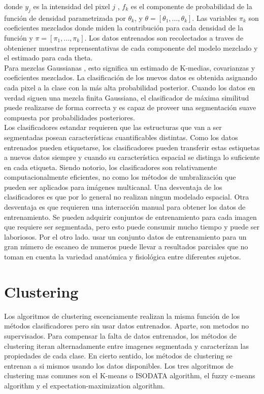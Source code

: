 \documentclass[12pt]{report}
\begin{document}
donde $y_{j}$ es la intensidad del pixel $j$ , $f_{k}$ es el componente de probabilidad de la función de densidad parametrizada por $\theta_{k}$, y $\theta = [\theta_{1},...,\theta_{k}]$. Las variables $\pi_{k}$ son coeficientes mezclados donde miden la contribución para cada densidad de la función y $\pi = [\pi_{1},...,\pi_{k}]$.
Los datos entrenados son recolectados a traves de obteniener muestras reprensentativas de cada componente del modelo mezclado y el estimado para cada theta.\\

Para mezclas Gaussianas , esto significa un estimado de K-medias, covarianzas y coeficientes mezclados.
La clasificación de los nuevos datos es obtenida asignando cada pixel a la clase con la más alta probabilidad posterior. Cuando los datos en verdad siguen una mezcla finita Gaussiana, el clasificador de  máxima similitud puede realizarse de forma correcta y es capaz de proveer una segmentación suave compuesta por probabilidades posteriores.\\

Los clasificadores estandar requieren que las estructuras que van a ser segmentadas posean características cuantificables distintas. Como los datos entrenados pueden etiquetarse, los clasificadores pueden transferir estas estiquetas a nuevos datos siempre y cuando su característica espacial se distinga lo suficiente en cada etiqueta. Siendo notorio, los clasificadores son relativamente computacionalmente eficientes, no como los métodos de umbralización que pueden ser aplicados para imágenes multicanal. Una desventaja de los clasificadores es que por lo general no realizan ningun modelado espacial. Otra desventaja es que requieren una interacción manual para obtener los datos de entrenamiento.
Se pueden adquirir conjuntos de entrenamiento para cada imagen que requiere ser segmentada, pero esto puede consumir mucho tiempo y puede ser laboriosos. Por el otro lado. usar un conjunto datos de entrenamiento para un gran número de escaneo de numeros puede llevar a resultados parciales que no toman en cuenta la variedad anatómica y fisiológica entre diferentes sujetos.\cite{metodos}

\section{Clustering}
Los algoritmos de clustering escenciamente realizan la misma función de los métodos clasificadores pero sin usar datos entrenados. Aparte, son metodos no supervisados. Para compensar la falta de datos entrenados, los métodos de clustering iteran alternadamente entre imagenes segmentada y caracterízan las propiedades de cada clase. En cierto sentido, los métodos de clustering se entrenan a si mismos usando los datos disponibles.
Los tres algoritmos de clustering mas comunes son el K-means o ISODATA algorithm, el fuzzy c-means algorithm y el expectation-maximization algorithm.\cite{split}
\end{document}
